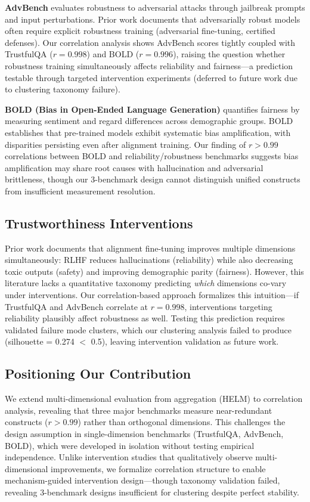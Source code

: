 \textbf{AdvBench} evaluates robustness to adversarial attacks through jailbreak prompts and input perturbations. Prior work documents that adversarially robust models often require explicit robustness training (adversarial fine-tuning, certified defenses). Our correlation analysis shows AdvBench scores tightly coupled with TrustfulQA ($r = 0.998$) and BOLD ($r = 0.996$), raising the question whether robustness training simultaneously affects reliability and fairness---a prediction testable through targeted intervention experiments (deferred to future work due to clustering taxonomy failure).

\textbf{BOLD (Bias in Open-Ended Language Generation)} quantifies fairness by measuring sentiment and regard differences across demographic groups. BOLD establishes that pre-trained models exhibit systematic bias amplification, with disparities persisting even after alignment training. Our finding of $r > 0.99$ correlations between BOLD and reliability/robustness benchmarks suggests bias amplification may share root causes with hallucination and adversarial brittleness, though our 3-benchmark design cannot distinguish unified constructs from insufficient measurement resolution.

\subsection{Trustworthiness Interventions}

Prior work documents that alignment fine-tuning improves multiple dimensions simultaneously: RLHF reduces hallucinations (reliability) while also decreasing toxic outputs (safety) and improving demographic parity (fairness). However, this literature lacks a quantitative taxonomy predicting \textit{which} dimensions co-vary under interventions. Our correlation-based approach formalizes this intuition---if TrustfulQA and AdvBench correlate at $r = 0.998$, interventions targeting reliability plausibly affect robustness as well. Testing this prediction requires validated failure mode clusters, which our clustering analysis failed to produce (silhouette = 0.274 $<$ 0.5), leaving intervention validation as future work.

\subsection{Positioning Our Contribution}

We extend multi-dimensional evaluation from aggregation (HELM) to correlation analysis, revealing that three major benchmarks measure near-redundant constructs ($r > 0.99$) rather than orthogonal dimensions. This challenges the design assumption in single-dimension benchmarks (TrustfulQA, AdvBench, BOLD), which were developed in isolation without testing empirical independence. Unlike intervention studies that qualitatively observe multi-dimensional improvements, we formalize correlation structure to enable mechanism-guided intervention design---though taxonomy validation failed, revealing 3-benchmark designs insufficient for clustering despite perfect stability.

